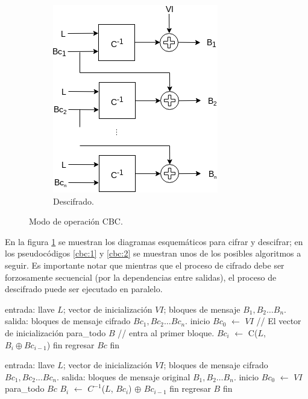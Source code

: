 \begin{figure}[H]
\begin{subfigure}{0.45\textwidth}
\begin{center}
          \includegraphics[width=0.7\linewidth]
            {contenidos/antecedentes/bloques/modos/diagramas/modo_cbc_inverso.png}
          \caption{Descifrado.}
      \end{center}
  \end{subfigure}
  \caption{Modo de operación CBC.}
  \label{figura:cbc}
\end{figure}

En la figura \ref{figura:cbc} se muestran los diagramas esquemáticos para
cifrar y descifrar; en los pseudocódigos \ref{cbc:1} y \ref{cbc:2} se muestran
unos de los posibles algoritmos a seguir. Es importante notar que mientras que
el proceso de cifrado debe ser forzosamente secuencial (por la dependencias
entre salidas), el proceso de descifrado puede ser ejecutado en paralelo.


\begin{pseudocodigo}[caption={Modo de operación CBC, cifrado.}, label={cbc:1}]
  entrada: llave $ L $; vector de inicialización $ VI $;
           bloques de mensaje $ B_1, B_2 \dots B_n $.
   salida: bloques de mensaje cifrado $ Bc_1, Bc_2 \dots Bc_n $.
  inicio
    $Bc_0$ $\gets$ $ VI $                        // El vector de inicialización
    para_todo $B$                // entra al primer bloque.
      $Bc_i$ $\gets$ C($L$, $B_i \oplus Bc_{i - 1}$)
    fin
    regresar $Bc$
  fin
\end{pseudocodigo}

\begin{pseudocodigo}[caption={Modo de operación CBC, descifrado.}, label={cbc:2}]
  entrada: llave $ L $; vector de inicialización $ VI $;
           bloques de mensaje cifrado $ Bc_1, Bc_2 \dots Bc_n $.
   salida: bloques de mensaje original $ B_1, B_2 \dots B_n $.
  inicio
    $Bc_0$ $\gets$ $ VI $
    para_todo $Bc$
      $B_i$ $\gets$ $C^{-1}$($L$, $Bc_i$) $\oplus$ $Bc_{i-1}$
    fin
    regresar $B$
  fin
\end{pseudocodigo}
